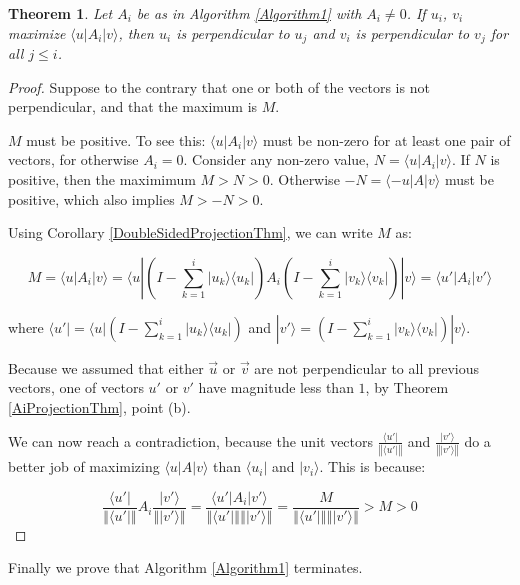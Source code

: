 \documentclass{amsbook}
\newtheorem{theorem}{Theorem}
\begin{document}
\begin{theorem}
\label{SVDPerpendicular}
Let $A_i$ be as in Algorithm \ref{Algorithm1} with $A_i\neq0$.  If $u_i$, $v_i$ maximize $\langle u |A_i| v \rangle$, then $u_i$ is perpendicular to $u_j$ and $v_i$ is perpendicular to $v_j$ for all $j\leq i$.
\end{theorem}

\begin{proof}
Suppose to the contrary that one or both of the vectors is not perpendicular, and that the maximum is $M$.

$M$ must be positive.  To see this:  $\langle u|A_i|v\rangle$ must be non-zero for at least one pair of vectors, for otherwise $A_i=0$.  Consider any non-zero value, $N=\langle u|A_i|v\rangle$.  If $N$ is positive, then the maximimum $M>N>0$.  Otherwise $-N=\langle -u|A|v\rangle$ must be positive, which also implies $M>-N>0$.

Using Corollary \ref{DoubleSidedProjectionThm}, we can write $M$ as:

$$
M=\langle u |A_i| v \rangle=\langle u |\left(I-\sum_{k=1}^i| u _k\rangle\langle u _k|\right)A_i\left(I-\sum_{k=1}^{i}| v _k\rangle\langle v _k|\right)| v \rangle=\langle u '|A_i| v '\rangle
$$

where $\langle u'|=\langle u |\left(I-\sum_{k=1}^i| u _k\rangle\langle u _k|\right)$ and $|v'\rangle=\left(I-\sum_{k=1}^{i}| v _k\rangle\langle v _k|\right)| v \rangle$.

Because we assumed that either $\vec u$ or $\vec v$ are not perpendicular to all previous vectors, one of vectors $ u '$ or $ v '$ have magnitude less than $1$, by Theorem \ref{AiProjectionThm}, point (b).

We can now reach a contradiction, because the unit vectors $\frac{\langle u '|}{\left\Vert\langle u '|\right\Vert}$ and $\frac{| v '\rangle}{\left\Vert| v '\rangle\right\Vert}$ do a better job of maximizing $\langle u|A|v\rangle$ than $\langle u_i|$ and $|v_i\rangle$.  This is because:

$$
\frac{\langle u '|}{\left\Vert\langle u '|\right\Vert}A_i\frac{| v '\rangle}{\left\Vert| v '\rangle\right\Vert} = \frac{\langle u'|A_i|v'\rangle}{\left\Vert\langle u '|\right\Vert\left\Vert| v '\rangle\right\Vert} = \frac{M}{\left\Vert\langle u '|\right\Vert\left\Vert| v '\rangle\right\Vert} > M >0
$$

\end{proof}

Finally we prove that Algorithm \ref{Algorithm1} terminates.
\end{document}
